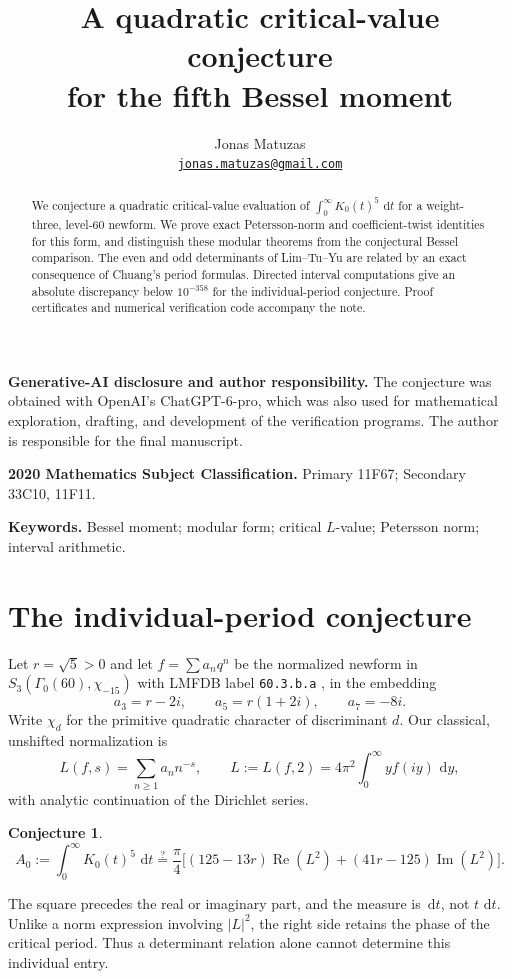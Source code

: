 \documentclass[11pt]{article}
\title{A quadratic critical-value conjecture\\for the fifth Bessel moment}
\author{Jonas Matuzas\\
\href{mailto:jonas.matuzas@gmail.com}{\nolinkurl{jonas.matuzas@gmail.com}}}
\date{}
\numberwithin{equation}{section}
\theoremstyle{definition}
\theoremstyle{remark}
\newcommand{\dd}{\,\mathrm d}
\theoremstyle{plain}
\newtheorem{conjecture}[theorem]{Conjecture}
\newcommand{\Real}{\operatorname{Re}}
\newcommand{\Imag}{\operatorname{Im}}
\begin{document}
\maketitle
\begin{abstract}
We conjecture a quadratic critical-value evaluation of
$\int_0^\infty K_0(t)^5\,\dd t$ for a weight-three, level-60 newform.
We prove exact Petersson-norm and coefficient-twist identities for this form,
and distinguish these modular theorems from the conjectural Bessel comparison.
The even and odd determinants of Lim--Tu--Yu are related by an exact consequence
of Chuang's period formulas. Directed interval computations give an absolute
discrepancy below $10^{-358}$ for the individual-period conjecture.
Proof certificates and numerical verification code accompany the note.
\end{abstract}

\noindent\textbf{Generative-AI disclosure and author responsibility.}
The conjecture was obtained with OpenAI's ChatGPT-6-pro, which was also used
for mathematical exploration, drafting, and development of the verification
programs. The author is responsible for the final manuscript.

\medskip
\noindent\textbf{2020 Mathematics Subject Classification.}
Primary 11F67; Secondary 33C10, 11F11.

\medskip
\noindent\textbf{Keywords.}
Bessel moment; modular form; critical $L$-value; Petersson norm; interval arithmetic.

\section{The individual-period conjecture}
Let $r=\sqrt5>0$ and let $f=\sum a_nq^n$ be the normalized newform in
$S_3(\Gamma_0(60),\chi_{-15})$ with LMFDB label \texttt{60.3.b.a}
\cite{LMFDB}, in the embedding
\[
 a_3=r-2i,\qquad a_5=r(1+2i),\qquad a_7=-8i.
\]
Write $\chi_d$ for the primitive quadratic character of discriminant $d$.
Our classical, unshifted normalization is
\begin{equation}\label{eq:L}
 L(f,s)=\sum_{n\ge1}a_nn^{-s},\qquad
 L:=L(f,2)=4\pi^2\int_0^\infty y f(iy)\,\dd y,
\end{equation}
with analytic continuation of the Dirichlet series.
\begin{conjecture}\label{conj:main}
\begin{equation}\label{eq:main}
 \boxed{A_0:=\int_0^\infty K_0(t)^5\,\dd t
 \stackrel?=\frac\pi4\big[(125-13r)\Real(L^2)+(41r-125)\Imag(L^2)\big].}
\end{equation}
\end{conjecture}
The square precedes the real or imaginary part, and the measure is $\dd t$,
not $t\,\dd t$. Unlike a norm expression involving $|L|^2$, the right side
retains the phase of the critical period. Thus a determinant relation alone
cannot determine this individual entry.
\end{document}
